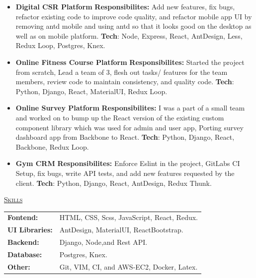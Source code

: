 \documentclass[11pt, a4paper]{article}
\begin{document}
\begin{flushleft}
\begin{itemize}
    \item {\bf{Digital CSR Platform}}
    \newline
    \textbf{Responsibilites:} Add new features, fix bugs, refactor existing code to improve code quality, and refactor mobile app UI by removing antd mobile and using antd so that it looks good on the desktop as well as on mobile platform.
    \newline
    \textbf{Tech}: Node, Express, React, AntDesign, Less, Redux Loop, Postgres, Knex. 

    \item \textbf{Online Fitness Course Platform}
    \newline
    \textbf{Responsibilites:} Started the project from scratch, Lead a team of 3, flesh out tasks/ features for the team members, review code to maintain consistency, and quality code.
    \newline
    \textbf{Tech}: Python, Django, React, MaterialUI, Redux Loop.

    \item \textbf{Online Survey Platform}
    \newline
    \textbf{Responsibilites:} I was a part of a small team and worked on to bump up the React version of the existing custom component library which was used for admin and user app, Porting survey dashboard app from Backbone to React.
    \newline
    \textbf{Tech}: Python, Django, React, Backbone, Redux Loop.

    \item \textbf{Gym CRM}
    \newline
    \textbf{Responsibilites:} Enforce Eslint in the project, GitLabs CI Setup, fix bugs, write API tests, and add new features requested by the client.
    \newline
    \textbf{Tech}: Python, Django, React, AntDesign, Redux Thunk.
    \newline
\end{itemize}

\end{flushleft}

\begin{flushleft}
    \uline{\textsc{\large{Skills}}\hfill}
    \newline
    \newline
    \begin{tabular}{l l}
        \textbf{Fontend: } & HTML, CSS, Scss, JavaScript, React, Redux.\\
        \textbf{UI Libraries: } & AntDesign, MaterialUI, ReactBootstrap.\\
        \textbf{Backend: } & Django, Node,and Rest API.\\
        \textbf{Database: } & Postgres, Knex.\\
        \textbf{Other: } & Git, VIM, CI, and AWS-EC2, Docker, Latex.\\
    \end{tabular}
    \newline
\end{flushleft}
\end{document}
